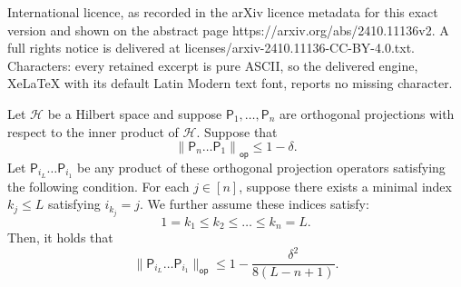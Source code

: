\documentclass[10pt,a4paper]{amsart}
\begin{document}
International licence, as recorded in the arXiv licence metadata for this exact version and shown on the abstract page https://arxiv.org/abs/2410.11136v2. A full rights notice is delivered at licenses/arxiv-2410.11136-CC-BY-4.0.txt. Characters: every retained excerpt is pure ASCII, so the delivered engine, XeLaTeX with its default Latin Modern text font, reports no missing character.
\begin{theorem}
\label{thm:gen_gap_2}
        Let $\mathcal{H}$ be a Hilbert space and suppose $\mathsf{P}_1,\ldots, \mathsf{P}_n$ are orthogonal projections with respect to the inner product of $\mathcal{H}$. Suppose that
        \begin{equation}
    \left\|\mathsf{P}_n\ldots \mathsf{P}_1\right\|_{\mathsf{op}}\leq 1-\delta.
\end{equation} 
Let $\mathsf{P}_{i_L}\ldots \mathsf{P}_{i_1}$ be any product of these orthogonal projection operators satisfying the following condition. For each $j\in [n]$, suppose there exists a minimal index $k_j\leq L$ satisfying $i_{k_j}=j$. We further assume these indices satisfy:
\begin{equation}
\label{eq:order_2}
        1=k_1\leq k_2\leq\ldots\leq k_n=L.
\end{equation}
Then, it holds that
\begin{equation*}
    \|\mathsf{P}_{i_L}\ldots \mathsf{P}_{i_1}\|_{\mathsf{op}}\leq 1-\frac{\delta^2}{8(L-n+1)}.
\end{equation*}
\end{theorem}
\end{document}

